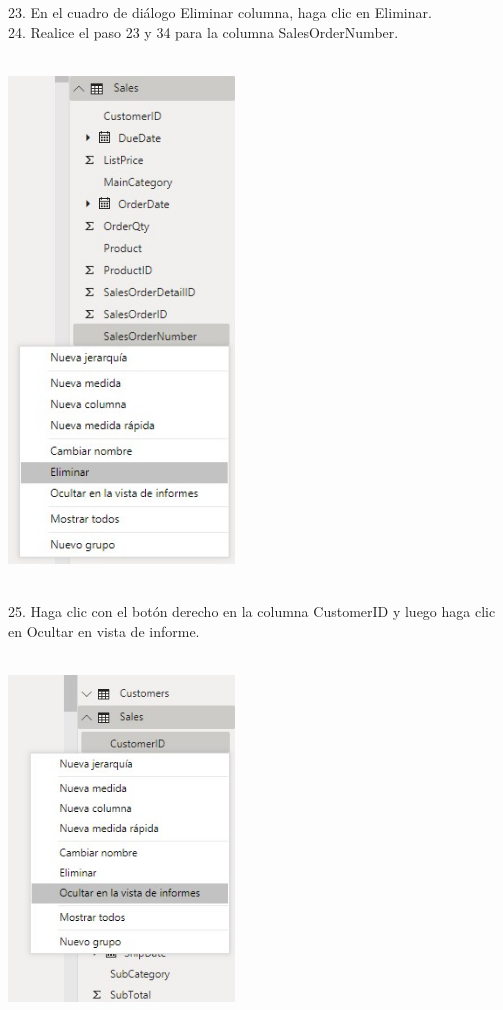 \begin{flushleft}
\begin{itemize}
23. En el cuadro de diálogo Eliminar columna, haga clic en Eliminar.\\
24. Realice el paso 23 y 34 para la columna SalesOrderNumber.\\
\textbf{ }\\
\begin{center}
	\includegraphics[width=6cm]{./Imagenes/image19} 
	\end{center}
\textbf{ }\\

25. Haga clic con el botón derecho en la columna CustomerID y luego haga clic en Ocultar en vista de informe.\\
\textbf{ }\\
\begin{center}
	\includegraphics[width=6cm]{./Imagenes/image20} 
	\end{center}
\textbf{ }\\


\end{itemize}
\end{flushleft}
